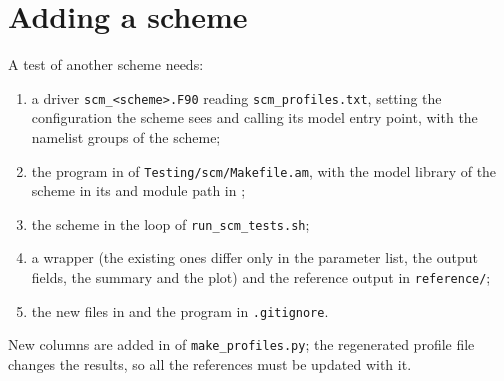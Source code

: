 \section{Adding a scheme}

A test of another scheme needs:
\begin{enumerate}
  \item a driver \verb=scm_<scheme>.F90= reading \verb=scm_profiles.txt=,
        setting the configuration the scheme sees and calling its model
        entry point, with the namelist groups of the scheme;
  \item the program in  of
        \verb=Testing/scm/Makefile.am=, with the model library of the
        scheme in its  and module path in ;
  \item the scheme in the loop of \verb=run_scm_tests.sh=;
  \item a wrapper (the existing ones differ only in the parameter list,
        the output fields, the summary and the plot) and the reference
        output in \verb=reference/=;
  \item the new files in  and the program in
        \verb=.gitignore=.
\end{enumerate}
New columns are added in  of \verb=make_profiles.py=; the
regenerated profile file changes the results, so all the references must
be updated with it.
